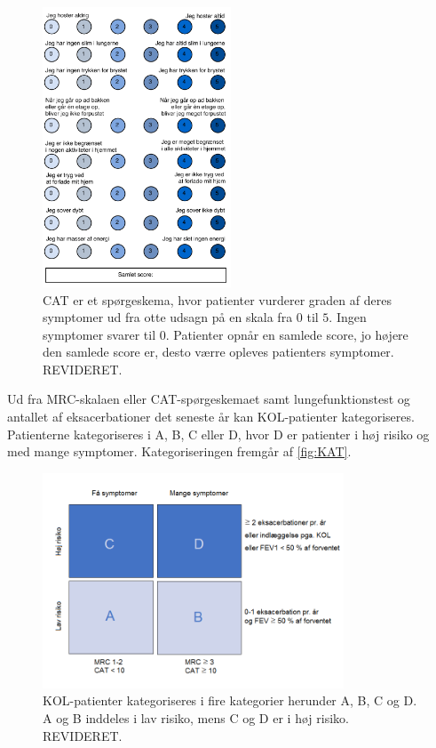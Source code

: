 \begin{figure} [H]
\centering
\includegraphics[width=0.5\textwidth]{figures/CAT}
\caption{CAT er et spørgeskema, hvor patienter vurderer graden af deres symptomer ud fra otte udsagn på en skala fra $0$ til $5$. Ingen symptomer svarer til $0$. Patienter opnår en samlede score, jo højere den samlede score er, desto værre opleves patienters symptomer. REVIDERET\cite{Basisbogen2016}.}
\label{fig:CAT}
\end{figure} 

\noindent
Ud fra MRC-skalaen eller CAT-spørgeskemaet samt lungefunktionstest og antallet af eksacerbationer det seneste år kan KOL-patienter kategoriseres. Patienterne kategoriseres i A, B, C eller D, hvor D er patienter i høj risiko og med mange symptomer. Kategoriseringen fremgår af \autoref{fig:KAT}.

\begin{figure} [H]
\centering
\includegraphics[width=0.8\textwidth]{figures/KAT}
\caption{KOL-patienter kategoriseres i fire kategorier herunder A, B, C og D. A og B inddeles i lav risiko, mens C og D er i høj risiko. REVIDERET\cite{Basisbogen2016}.}
\label{fig:KAT}
\end{figure} 
 
